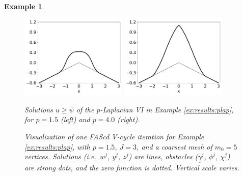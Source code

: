 \documentclass[letterpaper,final,12pt,reqno]{amsart}
\theoremstyle{cstyle}
\theoremstyle{cstyle*}
\theoremstyle{dstyle}
\newtheorem{example}[theorem]{Example}
\numberwithin{equation}{section}
\numberwithin{figure}{section}
\numberwithin{table}{section}
\numberwithin{theorem}{section}
\begin{document}
\begin{example}
\begin{figure}[ht]
\begin{center}
\includegraphics[width=0.45\textwidth]{fixfigs/plap1d1p5.pdf} \quad
\includegraphics[width=0.45\textwidth]{fixfigs/plap1d4p0.pdf}
\end{center}
\caption{Solutions $u\ge \psi$ of the $p$-Laplacian VI in Example \ref{ex:results:plap}, for $p=1.5$ (left) and $p=4.0$ (right).}
\label{fig:results:plap}
\end{figure}

\begin{figure}[ht]
\begin{center}

\end{center}
\caption{Visualization of one FAScd V-cycle iteration for Example \ref{ex:results:plap}, with $p=1.5$, $J=3$, and a coarsest mesh of $m_0=5$ vertices.  Solutions (i.e.~$w^j$, $y^j$, $z^j$) are lines, obstacles ($\underline{\gamma}^j$, $\underline{\phi}^j$, $\underline{\chi}^j$) are strong dots, and the zero function is dotted.  Vertical scale varies.}
\label{fig:imagesvcycle}
\end{figure}


\end{example}
\end{document}
